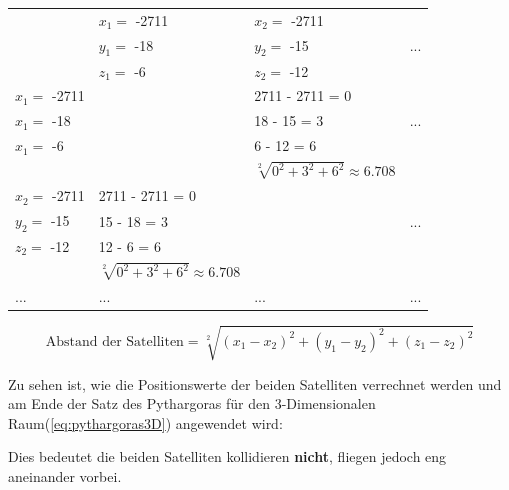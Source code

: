 \begin{tabular}{l | l | l | l}
               & \(x_1=\) -2711  & \(x_2=\) -2711   & \\
               & \(y_1=\) -18    & \(y_2=\) -15     & ... \\
               & \(z_1=\) -6     & \(z_2=\) -12     & \\\hline
 
\(x_1=\) -2711 &                 & 2711 - 2711 = 0  & \\
\(x_1=\) -18   &                 & 18 - 15 = 3      & ...\\
\(x_1=\) -6    &                 & 6 - 12 = 6       & \\
               &                 & \(\sqrt[2]{0^2 + 3^2 + 6^2} \approx 6.708\) & \\\hline
 
\(x_2=\) -2711 & 2711 - 2711 = 0 &                  & \\
\(y_2=\) -15   & 15 - 18 = 3     &                  & ... \\
\(z_2=\) -12   & 12 - 6 = 6      &                  & \\
               & \(\sqrt[2]{0^2 + 3^2 + 6^2} \approx 6.708\)  &                  & \\\hline
           ... & ...             & ...              & ... 
\end{tabular}

\bigskip

\begin{equation}\label{eq:pythargoras3D}
 \text{Abstand der Satelliten} = \sqrt[2]{(x_1 - x_2)^2 + (y_1 - y_2)^2 + (z_1 - z_2)^2}
\end{equation}

\bigskip

Zu sehen ist, wie die Positionswerte der beiden Satelliten verrechnet werden und am Ende der 
Satz des Pythargoras für den 3-Dimensionalen Raum(\ref{eq:pythargoras3D}) angewendet wird:



Dies bedeutet die beiden Satelliten kollidieren \textbf{nicht}, fliegen jedoch eng aneinander vorbei.